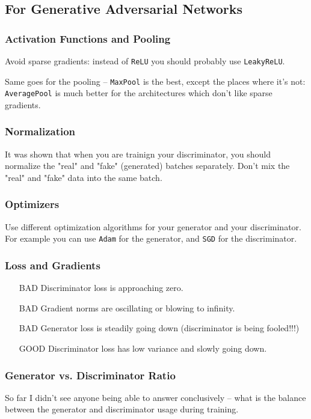 \subsection{For Generative Adversarial Networks}
\subsubsection*{Activation Functions and Pooling}
Avoid sparse gradients: instead of \verb+ReLU+ you should probably use \verb+LeakyReLU+.

Same goes for the pooling -- \verb+MaxPool+ is the best, except the places where it's not: \verb+AveragePool+ is much better for the architectures which don't like sparse gradients.

\subsubsection*{Normalization}
It was shown that when you are trainign your discriminator, you should normalize the "real" and "fake" (generated) batches separately.
Don't mix the "real" and "fake" data into the same batch.

\subsubsection*{Optimizers}
Use different optimization algorithms for your generator and your discriminator.
For example you can use \verb+Adam+ for the generator, and \verb+SGD+ for the discriminator.

\subsubsection*{Loss and Gradients}
\begin{itemize}
\item[\color{red!80!black}BAD] Discriminator loss is approaching zero.
\item[\color{red!80!black}BAD] Gradient norms are oscillating or blowing to infinity.
\item[\color{red!80!black}BAD] Generator loss is steadily going down (discriminator is being fooled!!!)
\item[\color{green!60!black}GOOD] Discriminator loss has low variance and slowly going down.
\end{itemize}

\subsubsection*{Generator vs. Discriminator Ratio}
So far I didn't see anyone being able to answer conclusively -- what is the balance between the generator and discriminator usage during training.

